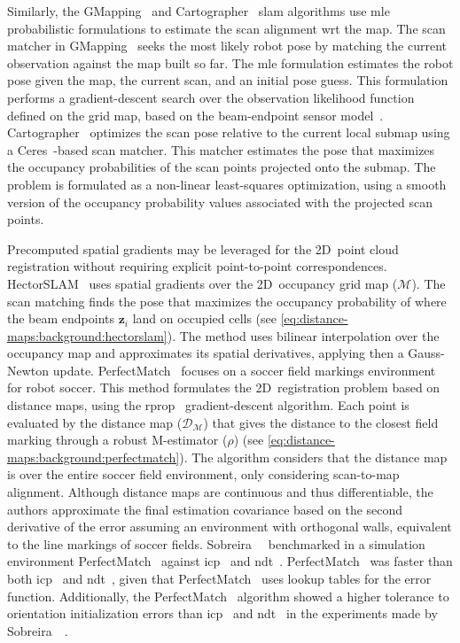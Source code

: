 Similarly, the GMapping~\cite{grisetti:tro:2007} and
Cartographer~\cite{hess:icra:2016} \gls{slam} algorithms use \gls{mle}
probabilistic formulations to estimate the scan alignment \gls{wrt} the map.
The scan matcher in GMapping~\cite{grisetti:tro:2007} seeks
the most likely robot pose by matching the current observation against
the map built so far. The \gls{mle} formulation estimates
the robot pose given the map, the current scan, and an initial pose guess.
This formulation performs a gradient-descent search over
the observation likelihood function defined on the grid map, based on the
beam-endpoint sensor model~\cite{thrun:book:2005}.
Cartographer~\cite{hess:icra:2016} optimizes the scan pose relative to
the current local submap using a Ceres~\cite{ceres:sw:2023}-based scan matcher.
This matcher estimates the pose that maximizes the occupancy probabilities of
the scan points projected onto the submap. The problem is formulated as
a non-linear least-squares optimization, using a smooth version of
the occupancy probability values associated with the projected scan points.

Precomputed spatial gradients may be leveraged for the 2D~point cloud
registration without requiring explicit point-to-point correspondences.
HectorSLAM~\cite{kohlbrecher:ssr:2011} uses spatial gradients over the
2D~occupancy grid map ($\mathcal{M}$).
The scan matching finds the pose that maximizes
the occupancy probability of where the beam endpoints $\mathbf{z}_i$ land on occupied
cells (see \eqref{eq:distance-maps:background:hectorslam}).
The method uses bilinear interpolation over the occupancy map and approximates
its spatial derivatives, applying then a Gauss-Newton update.
PerfectMatch~\cite{lauer:robocup:2006,sobreira:jint:2019} focuses on
a soccer field markings environment for robot soccer.
This method formulates the 2D~registration problem based on distance maps, using
the \gls{rprop}~\cite{riedmiller-braun:icnn:1993} gradient-descent algorithm.
Each point is evaluated by the distance map ($\mathcal{D}_\mathcal{M}$)
that gives the distance to the closest field marking through a
robust M-estimator ($\rho$)
(see \eqref{eq:distance-maps:background:perfectmatch}).
The algorithm considers that the distance map is over the entire soccer field
environment, only considering scan-to-map alignment.
Although distance maps are continuous and thus differentiable,
the authors approximate the final estimation covariance based on the second
derivative of the error assuming an environment with orthogonal walls,
equivalent to the line markings of soccer fields.
Sobreira~\etal~\cite{sobreira:jint:2019} benchmarked in a simulation environment
PerfectMatch~\cite{lauer:robocup:2006} against
\gls{icp}~\cite{besl-mckay:tpami:1992} and
\gls{ndt}~\cite{biber-strasser:iros:2003}.
PerfectMatch~\cite{lauer:robocup:2006} was faster than both
\gls{icp}~\cite{besl-mckay:tpami:1992} and
\gls{ndt}~\cite{biber-strasser:iros:2003}, given that
PerfectMatch~\cite{lauer:robocup:2006} uses lookup tables
for the error function.
Additionally, the PerfectMatch~\cite{lauer:robocup:2006} algorithm showed a
higher tolerance to orientation initialization errors than
\gls{icp}~\cite{besl-mckay:tpami:1992} and
\gls{ndt}~\cite{biber-strasser:iros:2003} in the experiments made by
Sobreira~\etal~\cite{sobreira:jint:2019}.

